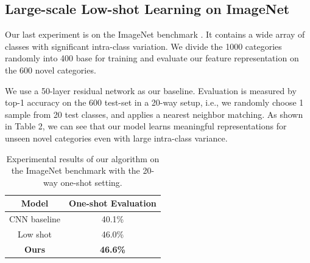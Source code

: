 \subsection{Large-scale Low-shot Learning on ImageNet}
Our last experiment is on the ImageNet benchmark \cite{russakovsky2015imagenet}. It contains a wide array of classes with significant intra-class variation. We divide the 1000 categories randomly into 400 base for training and evaluate our feature representation on the 600 novel categories. 

We use a 50-layer residual network \cite{residual_net} as our baseline. Evaluation is measured by top-1 accuracy on the 600 test-set in a 20-way setup, i.e., we randomly choose 1 sample from 20 test classes, and applies a nearest neighbor matching.
As shown in Table 2, %
we can see that our model learns meaningful representations for unseen novel categories even with large intra-class variance.
\begin{table}
\center
\begin{small}
\renewcommand{\arraystretch}{1.1}
\begin{tabular}{c|c}
\hline
Model & One-shot Evaluation \\
\hline
CNN baseline & 40.1\%\\
Low shot \cite{low-shot} & 46.0\% \\
\textbf{Ours} & \textbf{46.6\%}\\
\hline
\end{tabular}
\caption{Experimental results of our algorithm on the ImageNet benchmark \cite{russakovsky2015imagenet} with the 20-way one-shot setting. }
\end{small}
\label{tab:imagenet}
\end{table}

